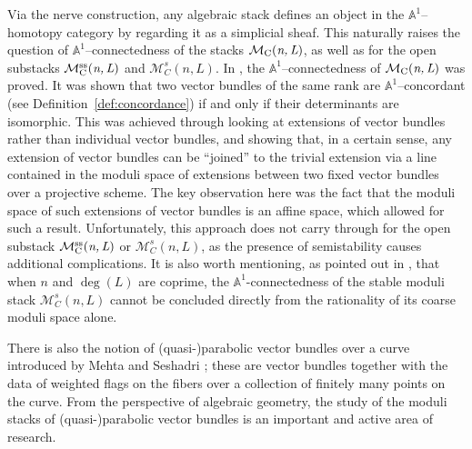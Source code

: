 \documentclass[12pt,reqno]{amsart}
\DeclareMathOperator{\mnl}{\mc{M}_C(\textit{n,\,L})}
\DeclareMathOperator{\mnlss}{\mc{M}^{ss}_C(\textit{n,\,L})}
\newcommand{\mc}[1]{\mathcal{#1}}
\newcommand{\bb}[1]{\mathbb{#1}}
\theoremstyle{definition}
\numberwithin{equation}{section}
\begin{document}
	Via the nerve construction, any algebraic stack defines an object in the
	$\bb{A}^1$--homotopy category \cite{MV99} by regarding it as a simplicial
	sheaf. This naturally raises the question of $\bb{A}^1$--connectedness of
	the stacks $\mnl$, as well as for the open substacks $\mnlss$ and
	$\mc{M}_C^s(n,L)$. In \cite{HY24}, the $\bb{A}^1$--connectedness of $\mnl$
	was proved. It was shown that two vector bundles of the same rank are
	$\bb{A}^1$--concordant (see Definition~\ref{def:concordance}) if and only if
	their determinants are isomorphic. This was achieved through looking at
	extensions of vector bundles rather than individual vector bundles, and
	showing that, in a certain sense, any extension of vector bundles can be
	``joined'' to the trivial extension via a line contained in the moduli space
	of extensions between two fixed vector bundles over a projective scheme. The
	key observation here was the fact that the moduli space of such extensions of
	vector bundles is an affine space, which allowed for such a result.
	Unfortunately, this approach does not carry through for the open substack
	$\mnlss$ or $\mc{M}_C^s(n,L)$, as the presence of semistability causes
	additional complications. It is also worth mentioning, as pointed out in
	\cite[Example~2.9]{HY24}, that when $n$ and $\deg(L)$ are coprime, the
	$\bb{A}^1$-connectedness of the stable moduli stack $\mc{M}^{s}_C(n,L)$
	cannot be concluded directly from the rationality of its coarse moduli space
	alone.
	
	There is also the notion of (quasi-)parabolic vector bundles over a curve
	introduced by Mehta and Seshadri \cite{MS80}; these are vector bundles
	together with the data of weighted flags on the fibers over a collection of
	finitely many points on the curve. From the perspective of algebraic
	geometry, the study of the moduli stacks of (quasi-)parabolic vector bundles
	is an important and active area of research.
	
\end{document}
